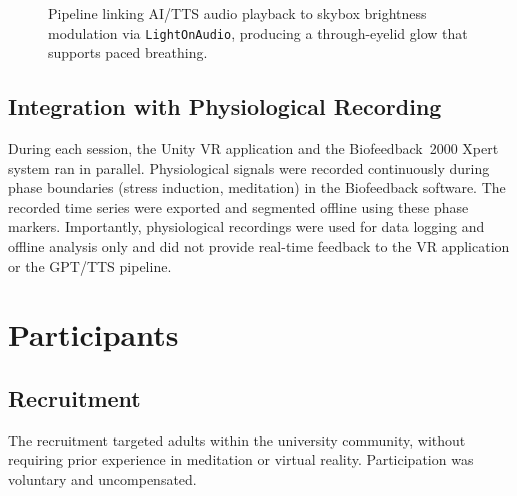 \begin{figure}[H]
\centering
{}
\caption{Pipeline linking AI/TTS audio playback to skybox brightness modulation via \texttt{LightOnAudio}, producing a through-eyelid glow that supports paced breathing.}
\label{fig:light-skybox-pipeline}
\end{figure}




\subsection{Integration with Physiological Recording}
During each session, the Unity VR application and the Biofeedback~2000 Xpert system ran in parallel. Physiological signals were recorded continuously during phase boundaries (stress induction, meditation) in the Biofeedback software. The recorded time series were exported and segmented offline using these phase markers. Importantly, physiological recordings were used for data logging and offline analysis only and did not provide real-time feedback to the VR application or the GPT/TTS pipeline.


\section{Participants}

\subsection{Recruitment}
The recruitment targeted adults within the university community, without requiring prior experience in meditation or virtual reality. Participation was voluntary and uncompensated.

